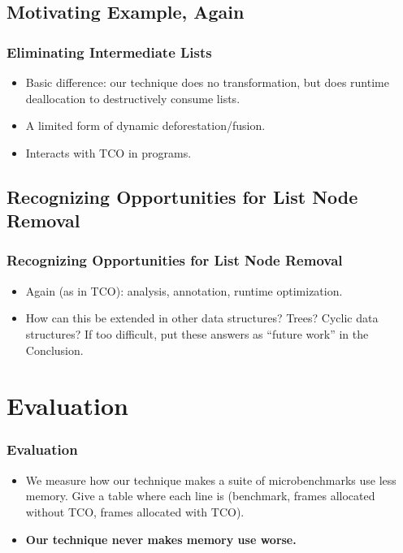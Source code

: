 \documentclass{beamer}
\begin{document}
\subsection{Motivating Example, Again}

\begin{frame}
  \frametitle{Eliminating Intermediate Lists}
  \begin{itemize}
  \item Basic difference: our technique does no transformation, but
    does runtime deallocation to destructively consume lists.
  \item A limited form of dynamic deforestation/fusion.
  \item Interacts with TCO in programs.
  \end{itemize}
\end{frame}

\subsection{Recognizing Opportunities for List Node Removal}

\begin{frame}
  \frametitle{Recognizing Opportunities for List Node Removal}

  \begin{itemize}
  \item Again (as in TCO): analysis, annotation, runtime optimization.
  \item How can this be extended in other data structures? Trees?
    Cyclic data structures? If too difficult, put these answers as
    ``future work'' in the Conclusion.
  \end{itemize}

\end{frame}

\section{Evaluation}

\begin{frame}
  \frametitle{Evaluation}

  \begin{itemize}
  \item We measure how our technique makes a suite of microbenchmarks
    use less memory. Give a table where each line is (benchmark,
    frames allocated without TCO, frames allocated with TCO).
  \item \textbf{Our technique never makes memory use worse.}
  \end{itemize}
\end{frame}
\end{document}
